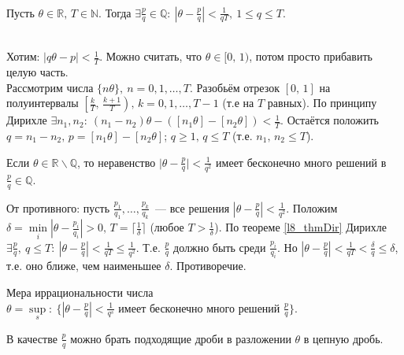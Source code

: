 \begin{theorem} \label{l8_thmDir}~\\
	Пусть $\theta \in \mathbb{R}, \, T \in \mathbb{N}$. Тогда
	$\displaystyle \exists \frac{p}{q} \in \mathbb{Q}: \ \left| \theta - \frac{p}{q} \right| < \frac{1}{qT}, \ 1 \leq q \leq T$.
\end{theorem}
\begin{pf}~\\
	Хотим: $\displaystyle |q\theta - p| < \frac{1}{T}$. Можно считать, что $\theta \in [0, \, 1)$, потом просто прибавить целую часть.\\
	Рассмотрим числа $\{ n\theta \}, \ n = 0,1,\dots,T$. Разобьём отрезок $[0, \, 1]$ на полуинтервалы
	$\displaystyle \left[ \frac{k}{T}, \, \frac{k+1}{T} \right), \, k=0,1,\dots,T-1$ (т.е на $T$ равных). По принципу Дирихле
	$\displaystyle \exists n_1,n_2: \ \left( n_1 - n_2 \right)\theta - \left( \left[n_1\theta\right]-\left[n_2\theta\right] \right) < \frac{1}{T}$.
	Остаётся положить $q = n_1-n_2, \, p = \left[ n_1\theta \right] - \left[ n_2\theta \right]$; $q \geq 1, \, q \leq T$ (т.е. $n_1,\,n_2 \leq T$).
\end{pf}

\begin{corollary}
	Если $\theta \in \mathbb{R} \backslash \mathbb{Q}$, то неравенство
	$\displaystyle \lvert \theta - \frac{p}{q} \rvert < \frac{1}{q^2}$ имеет бесконечно много решений в $\frac{p}{q} \in \mathbb{Q}$.
\end{corollary}
\begin{pf}
	От противного: пусть $\displaystyle \frac{p_1}{q_1},\dots,\frac{p_k}{q_k}$ — все решения $\displaystyle \left| \theta - \frac{p}{q} \right| < \frac{1}{q^2}$. Положим $\displaystyle \delta = \min\limits_i \left| \theta - \frac{p_i}{q_i} \right| > 0, \, T = \lceil \frac{1}{\delta} \rceil$ (любое $\displaystyle T > \frac{1}{\delta}$). По теореме \ref{l8_thmDir} Дирихле $\displaystyle \exists \frac{p}{q}, \ q \leq T: \ \left| \theta - \frac{p}{q} \right| < \frac{1}{qT} \leq \frac{1}{q^2}$. Т.е. $\displaystyle \frac{p}{q}$ должно быть среди $\displaystyle \frac{p_i}{q_i}$. Но $\displaystyle \left| \theta - \frac{p}{q} \right| < \frac{1}{qT} < \frac{\delta}{q} \leq \delta$, т.е. оно ближе, чем наименьшее $\delta$. Противоречие.
\end{pf}

Мера иррациональности числа $\displaystyle \theta = \sup\limits_s : \ \{ \left| \theta - \frac{p}{q} \right| < \frac{1}{q^s} \text{ имеет бесконечно много решений } \frac{p}{q} \}$.

В качестве $\displaystyle \frac{p}{q}$ можно брать подходящие дроби в разложении $\theta$ в цепную дробь.